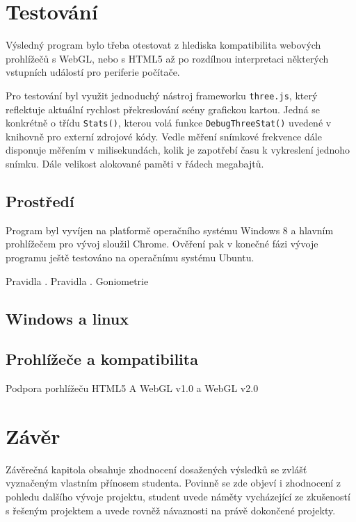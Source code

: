 \newpage

\chapter{Testování}
\label{chapter:5}
Výsledný program bylo třeba otestovat z  hlediska kompatibilita webových prohlížečů  s WebGL, nebo s HTML5 až po rozdílnou interpretaci některých vstupních událostí pro periferie počítače. 

Pro testování byl využit jednoduchý nástroj frameworku \texttt{three.js}, který reflektuje aktuální rychlost překreslování scény grafickou kartou. Jedná se konkrétně o třídu \texttt{Stats()}, kterou volá funkce \texttt{DebugThreeStat()} uvedené v knihovně pro externí zdrojové kódy. Vedle měření snímkové frekvence dále disponuje měřením v milisekundách, kolik je zapotřebí času k vykreslení jednoho snímku. Dále velikost alokované paměti v řádech megabajtů.

\section*{Prostředí}
Program byl vyvíjen na platformě operačního systému Windows 8 a hlavním prohlížečem pro vývoj sloužil Chrome. Ověření pak v konečné fázi vývoje programu ještě testováno na operačnímu systému Ubuntu.


Pravidla \cite{Kompendium}. Pravidla \cite{Goniometrie}. 
Goniometrie



\section{Windows a linux}
\section{Prohlížeče a kompatibilita}
Podpora porhlížeču HTML5 A WebGL v1.0 a WebGL v2.0

\chapter{Závěr}
\label{chapter:6}

Závěrečná kapitola obsahuje zhodnocení dosažených výsledků se zvlášť vyznačeným vlastním přínosem studenta. Povinně se zde objeví i zhodnocení z pohledu dalšího vývoje projektu, student uvede náměty vycházející ze zkušeností s řešeným projektem a uvede rovněž návaznosti na právě dokončené projekty.

